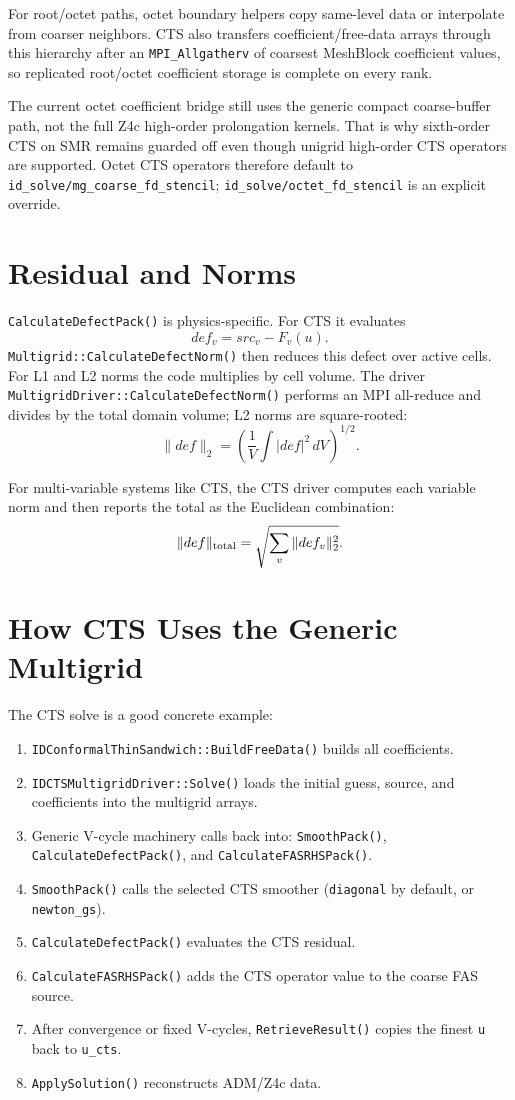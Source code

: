 \documentclass[11pt]{article}
\newcommand{\code}[1]{\texttt{#1}}
\begin{document}
For root/octet paths, octet boundary helpers copy same-level data or
interpolate from coarser neighbors.  CTS also transfers coefficient/free-data
arrays through this hierarchy after an \code{MPI\_Allgatherv} of coarsest
MeshBlock coefficient values, so replicated root/octet coefficient storage is
complete on every rank.

The current octet coefficient bridge still uses the generic compact
coarse-buffer path, not the full Z4c high-order prolongation kernels.  That is
why sixth-order CTS on SMR remains guarded off even though unigrid high-order CTS
operators are supported.  Octet CTS operators therefore default to
\code{id\_solve/mg\_coarse\_fd\_stencil}; \code{id\_solve/octet\_fd\_stencil}
is an explicit override.

\section{Residual and Norms}

\code{CalculateDefectPack()} is physics-specific.  For CTS it evaluates
\[
  def_v = src_v - F_v(u).
\]
\code{Multigrid::CalculateDefectNorm()} then reduces this defect over active
cells.  For L1 and L2 norms the code multiplies by cell volume.  The driver
\code{MultigridDriver::CalculateDefectNorm()} performs an MPI all-reduce and
divides by the total domain volume; L2 norms are square-rooted:
\[
  \|def\|_2 =
  \left(\frac{1}{V}\int |def|^2\,dV\right)^{1/2}.
\]

For multi-variable systems like CTS, the CTS driver computes each variable norm
and then reports the total as the Euclidean combination:
\[
  \|def\|_{\rm total}
  = \sqrt{\sum_v \|def_v\|_2^2}.
\]

\section{How CTS Uses the Generic Multigrid}

The CTS solve is a good concrete example:
\begin{enumerate}
  \item \code{IDConformalThinSandwich::BuildFreeData()} builds all coefficients.
  \item \code{IDCTSMultigridDriver::Solve()} loads the initial guess, source, and
        coefficients into the multigrid arrays.
  \item Generic V-cycle machinery calls back into:
        \code{SmoothPack()}, \code{CalculateDefectPack()}, and
        \code{CalculateFASRHSPack()}.
  \item \code{SmoothPack()} calls the selected CTS smoother
        (\code{diagonal} by default, or \code{newton\_gs}).
  \item \code{CalculateDefectPack()} evaluates the CTS residual.
  \item \code{CalculateFASRHSPack()} adds the CTS operator value to the coarse
        FAS source.
  \item After convergence or fixed V-cycles, \code{RetrieveResult()} copies the
        finest \code{u} back to \code{u\_cts}.
  \item \code{ApplySolution()} reconstructs ADM/Z4c data.
\end{enumerate}
\end{document}
